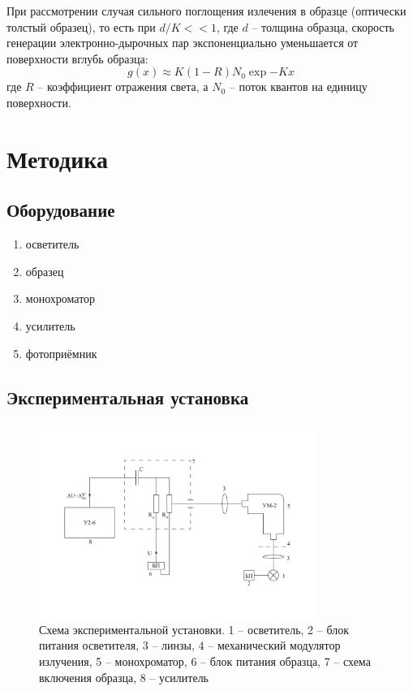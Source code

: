 \documentclass[a4paper, 12pt]{extarticle}
\begin{document}
При рассмотрении случая сильного поглощения излечения в образце (оптически толстый образец), то есть при $d/K<<1$, где $d$ -- толщина образца, скорость генерации электронно-дырочных пар экспоненциально уменьшается от поверхности вглубь образца:
\begin{equation}
    g(x)\approx K(1-R)N_0\exp{-Kx}
\end{equation}
где $R$ -- коэффициент отражения света, а $N_0$ -- поток квантов на единицу поверхности.


\section*{\textcolor{header}{Методика}}

\subsection*{\textcolor{sub_header}{Оборудование}}
\begin{enumerate}
    \item осветитель
    \item образец
    \item монохроматор
    \item усилитель
    \item фотоприёмник
\end{enumerate}
\subsection*{\textcolor{sub_header}{Экспериментальная установка}}

\begin{figure}[!htb]
    \centering
    \includegraphics[width= 0.8\textwidth]{exp_scheme.pdf}
    \caption{Схема экспериментальной установки. 1 -- осветитель, 2 -- блок питания осветителя, 3 -- линзы, 4 -- механический модулятор излучения, 5 -- монохроматор, 6 -- блок питания образца, 7 -- схема включения образца, 8 -- усилитель}
\end{figure}
\end{document}
